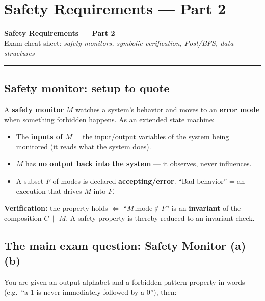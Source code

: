 \chapter{Safety Requirements --- Part 2}

\begin{center}
{\Large\bfseries Safety Requirements --- Part 2}\\[1pt]
{\small Exam cheat-sheet: \emph{safety monitors, symbolic verification, Post/BFS, data structures}}
\end{center}
\hrule
\vspace{4pt}

\section{Safety monitor: setup to quote}
A \textbf{safety monitor} $M$ watches a system's behavior and moves to an \textbf{error mode} when something forbidden happens. As an extended state machine:
\begin{itemize}
  \item The \textbf{inputs of $M$} = the input/output variables of the system being monitored (it reads what the system does).
  \item $M$ has \textbf{no output back into the system} --- it observes, never influences.
  \item A subset $F$ of modes is declared \textbf{accepting/error}. ``Bad behavior'' = an execution that drives $M$ into $F$.
\end{itemize}
\begin{keybox}
\textbf{Verification:} the property holds $\iff$ ``$M.\text{mode}\notin F$'' is an \textbf{invariant} of the composition $C\,\|\,M$. A safety property is thereby reduced to an invariant check.
\end{keybox}

\section{The main exam question: Safety Monitor (a)--(b)}
You are given an output alphabet and a forbidden-pattern property in words (e.g.\ ``a $1$ is never immediately followed by a $0$''), then:

